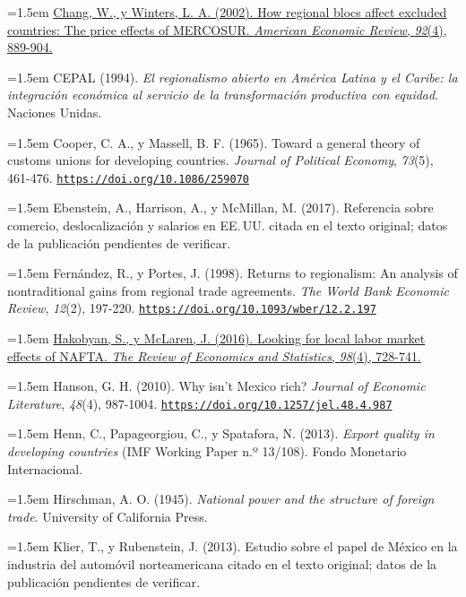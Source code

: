\documentclass[10pt,a4paper]{article}
\begin{document}
\noindent\hangindent=1.5em \href{https://ideas.repec.org/a/aea/aecrev/v92y2002i4p889-904.html}{Chang, W., y Winters, L. A. (2002). How regional blocs affect excluded countries: The price effects of MERCOSUR. \textit{American Economic Review}, \textit{92}(4), 889-904.}

\noindent\hangindent=1.5em CEPAL (1994). \textit{El regionalismo abierto en América Latina y el Caribe: la integración económica al servicio de la transformación productiva con equidad}. Naciones Unidas.

\noindent\hangindent=1.5em Cooper, C. A., y Massell, B. F. (1965). Toward a general theory of customs unions for developing countries. \textit{Journal of Political Economy}, \textit{73}(5), 461-476. \href{https://doi.org/10.1086/259070}{\nolinkurl{https://doi.org/10.1086/259070}}

\noindent\hangindent=1.5em Ebenstein, A., Harrison, A., y McMillan, M. (2017). Referencia sobre comercio, deslocalización y salarios en EE.\,UU. citada en el texto original; datos de la publicación pendientes de verificar.

\noindent\hangindent=1.5em Fernández, R., y Portes, J. (1998). Returns to regionalism: An analysis of nontraditional gains from regional trade agreements. \textit{The World Bank Economic Review}, \textit{12}(2), 197-220. \href{https://doi.org/10.1093/wber/12.2.197}{\nolinkurl{https://doi.org/10.1093/wber/12.2.197}}

\noindent\hangindent=1.5em \href{https://www.nber.org/papers/w16535}{Hakobyan, S., y McLaren, J. (2016). Looking for local labor market effects of NAFTA. \textit{The Review of Economics and Statistics}, \textit{98}(4), 728-741.}

\noindent\hangindent=1.5em Hanson, G. H. (2010). Why isn't Mexico rich? \textit{Journal of Economic Literature}, \textit{48}(4), 987-1004. \href{https://doi.org/10.1257/jel.48.4.987}{\nolinkurl{https://doi.org/10.1257/jel.48.4.987}}

\noindent\hangindent=1.5em Henn, C., Papageorgiou, C., y Spatafora, N. (2013). \textit{Export quality in developing countries} (IMF Working Paper n.º 13/108). Fondo Monetario Internacional.

\noindent\hangindent=1.5em Hirschman, A. O. (1945). \textit{National power and the structure of foreign trade}. University of California Press.

\noindent\hangindent=1.5em Klier, T., y Rubenstein, J. (2013). Estudio sobre el papel de México en la industria del automóvil norteamericana citado en el texto original; datos de la publicación pendientes de verificar.
\end{document}
